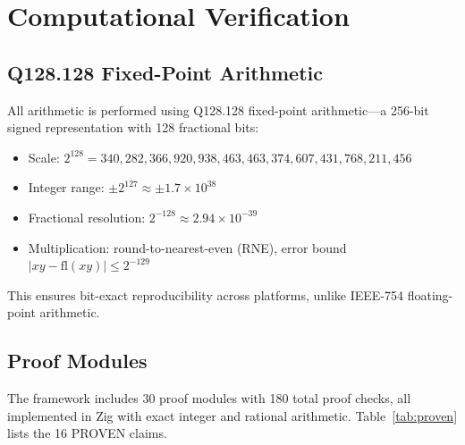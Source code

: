 \documentclass[11pt]{article}
\begin{document}
\section{Computational Verification}

\subsection{Q128.128 Fixed-Point Arithmetic}

All arithmetic is performed using Q128.128 fixed-point arithmetic---a 256-bit signed representation with 128 fractional bits:
\begin{itemize}
\item Scale: $2^{128} = 340{,}282{,}366{,}920{,}938{,}463{,}463{,}374{,}607{,}431{,}768{,}211{,}456$
\item Integer range: $\pm 2^{127} \approx \pm 1.7 \times 10^{38}$
\item Fractional resolution: $2^{-128} \approx 2.94 \times 10^{-39}$
\item Multiplication: round-to-nearest-even (RNE), error bound $|xy - \text{fl}(xy)| \leq 2^{-129}$
\end{itemize}

This ensures bit-exact reproducibility across platforms, unlike IEEE-754 floating-point arithmetic.

\subsection{Proof Modules}

The framework includes 30 proof modules with 180 total proof checks, all implemented in Zig with exact integer and rational arithmetic. Table~\ref{tab:proven} lists the 16 PROVEN claims.
\end{document}
